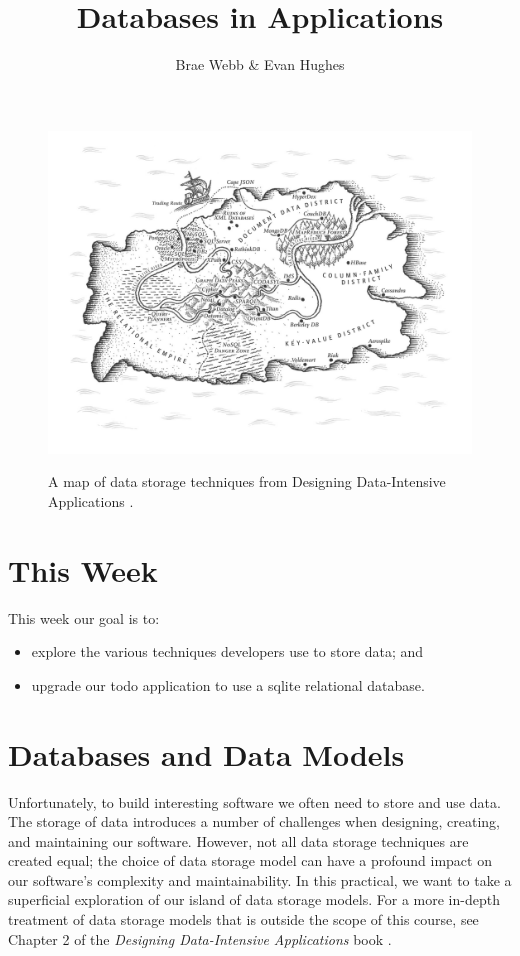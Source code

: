 \documentclass{csse4400}
\title{Databases in Applications}
\author{Brae Webb \& Evan Hughes}
\date{\week{2}}
\begin{document}
\maketitle

\begin{figure}[h]
  \href{https://www.oreilly.com/library/view/designing-data-intensive-applications/9781491903063/ch02.html}{
    \includegraphics[width=\textwidth]{images/databases}
  }
\caption{A map of data storage techniques from Designing Data-Intensive Applications \cite{data-intensive}.}
\end{figure}

\section{This Week}
This week our goal is to:
\begin{itemize}
  \item explore the various techniques developers use to store data; and
  \item upgrade our todo application to use a sqlite relational database.
\end{itemize}

\clearpage

\section{Databases and Data Models}
Unfortunately, to build interesting software we often need to store and use data.
The storage of data introduces a number of challenges when designing, creating, and maintaining our software.
However, not all data storage techniques are created equal;
the choice of data storage model can have a profound impact on our software's complexity and maintainability.
In this practical, we want to take a superficial exploration of our island of data storage models.
For a more in-depth treatment of data storage models that is outside the scope of this course,
see Chapter 2 of the \textit{Designing Data-Intensive Applications} book \cite{data-intensive}.
\end{document}
